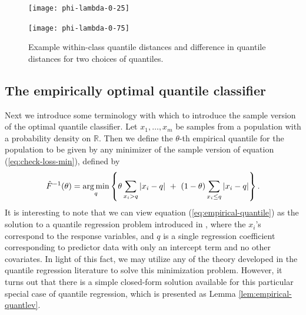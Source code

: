 \begin{figure}[ht]
  \caption[cccc]{Example within-class quantile distances and difference in
    quantile distances for two choices of quantiles.}

  \label{fig:phi-lambda}
  \vspace{5mm}
  
  \begin{minipage}[t]{0.49\linewidth}
    \centering
    \texttt{[image: phi-lambda-0-25]}
  \end{minipage}
  \begin{minipage}[t]{0.49\linewidth}
    \centering
    \texttt{[image: phi-lambda-0-75]}
  \end{minipage}
  
\end{figure}




\subsection{The empirically optimal quantile classifier}
\label{sec:empirical-classifier}

Next we introduce some terminology with which to introduce the sample version of
the optimal quantile classifier.  Let $x_1, \dots, x_m$ be samples from a
population with a probability density on $\mathbb{R}$.  Then we define the
$\theta$-th empirical quantile for the population to be given by any minimizer
of the sample version of equation (\ref{eq:check-loss-min}), defined by
\begin{equation}
  \label{eq:empirical-quantile}
  \hat{F}^{-1} (\theta) = \operatorname*{arg\,min}_q \left\{
    \theta \sum_{ x_{i} > q } |x_{i} - q| ~+~
    (1 - \theta) \sum_{ x_{i} \leq q } |x_{i} - q|
  \right\}.
\end{equation}
It is interesting to note that we can view equation
(\ref{eq:empirical-quantile}) as the solution to a quantile regression problem
introduced in \cite{koenker1978}, where the $x_i$'s correspond to the response
variables, and $q$ is a single regression coefficient corresponding to predictor
data with only an intercept term and no other covariates.  In light of this
fact, we may utilize any of the theory developed in the quantile regression
literature to solve this minimization problem.  However, it turns out that there
is a simple closed-form solution available for this particular special case of
quantile regression, which is presented as Lemma \ref{lem:empirical-quantlev}.

